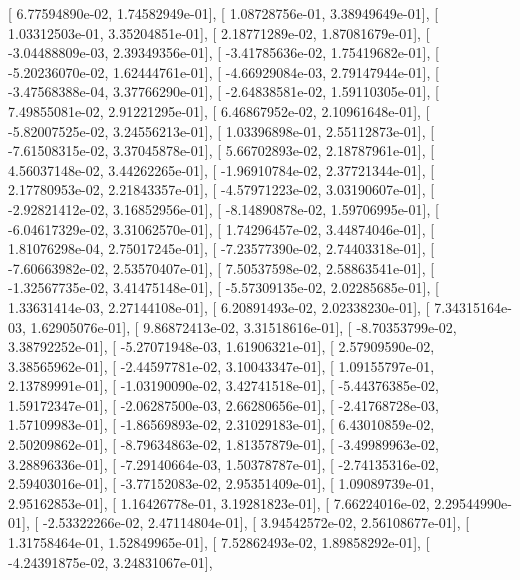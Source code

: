 \documentclass{article}
\begin{document}
       [  6.77594890e-02,   1.74582949e-01],
       [  1.08728756e-01,   3.38949649e-01],
       [  1.03312503e-01,   3.35204851e-01],
       [  2.18771289e-02,   1.87081679e-01],
       [ -3.04488809e-03,   2.39349356e-01],
       [ -3.41785636e-02,   1.75419682e-01],
       [ -5.20236070e-02,   1.62444761e-01],
       [ -4.66929084e-03,   2.79147944e-01],
       [ -3.47568388e-04,   3.37766290e-01],
       [ -2.64838581e-02,   1.59110305e-01],
       [  7.49855081e-02,   2.91221295e-01],
       [  6.46867952e-02,   2.10961648e-01],
       [ -5.82007525e-02,   3.24556213e-01],
       [  1.03396898e-01,   2.55112873e-01],
       [ -7.61508315e-02,   3.37045878e-01],
       [  5.66702893e-02,   2.18787961e-01],
       [  4.56037148e-02,   3.44262265e-01],
       [ -1.96910784e-02,   2.37721344e-01],
       [  2.17780953e-02,   2.21843357e-01],
       [ -4.57971223e-02,   3.03190607e-01],
       [ -2.92821412e-02,   3.16852956e-01],
       [ -8.14890878e-02,   1.59706995e-01],
       [ -6.04617329e-02,   3.31062570e-01],
       [  1.74296457e-02,   3.44874046e-01],
       [  1.81076298e-04,   2.75017245e-01],
       [ -7.23577390e-02,   2.74403318e-01],
       [ -7.60663982e-02,   2.53570407e-01],
       [  7.50537598e-02,   2.58863541e-01],
       [ -1.32567735e-02,   3.41475148e-01],
       [ -5.57309135e-02,   2.02285685e-01],
       [  1.33631414e-03,   2.27144108e-01],
       [  6.20891493e-02,   2.02338230e-01],
       [  7.34315164e-03,   1.62905076e-01],
       [  9.86872413e-02,   3.31518616e-01],
       [ -8.70353799e-02,   3.38792252e-01],
       [ -5.27071948e-03,   1.61906321e-01],
       [  2.57909590e-02,   3.38565962e-01],
       [ -2.44597781e-02,   3.10043347e-01],
       [  1.09155797e-01,   2.13789991e-01],
       [ -1.03190090e-02,   3.42741518e-01],
       [ -5.44376385e-02,   1.59172347e-01],
       [ -2.06287500e-03,   2.66280656e-01],
       [ -2.41768728e-03,   1.57109983e-01],
       [ -1.86569893e-02,   2.31029183e-01],
       [  6.43010859e-02,   2.50209862e-01],
       [ -8.79634863e-02,   1.81357879e-01],
       [ -3.49989963e-02,   3.28896336e-01],
       [ -7.29140664e-03,   1.50378787e-01],
       [ -2.74135316e-02,   2.59403016e-01],
       [ -3.77152083e-02,   2.95351409e-01],
       [  1.09089739e-01,   2.95162853e-01],
       [  1.16426778e-01,   3.19281823e-01],
       [  7.66224016e-02,   2.29544990e-01],
       [ -2.53322266e-02,   2.47114804e-01],
       [  3.94542572e-02,   2.56108677e-01],
       [  1.31758464e-01,   1.52849965e-01],
       [  7.52862493e-02,   1.89858292e-01],
       [ -4.24391875e-02,   3.24831067e-01],
\end{document}
